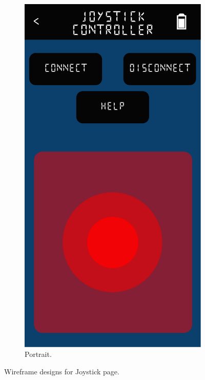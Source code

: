 \documentclass{l4proj}
\begin{document}
\begin{appendices}
\begin{figure}[!ht]
\begin{subfigure}{0.32\textwidth}
        \includegraphics[width=\textwidth]{images/joystick-wireframe-2.pdf}
        \caption{Portrait.}
        \label{fig:joystick-wireframe-2} 
    \end{subfigure}
    \caption{Wireframe designs for Joystick page.}
\end{figure}


\end{appendices}
\end{document}
